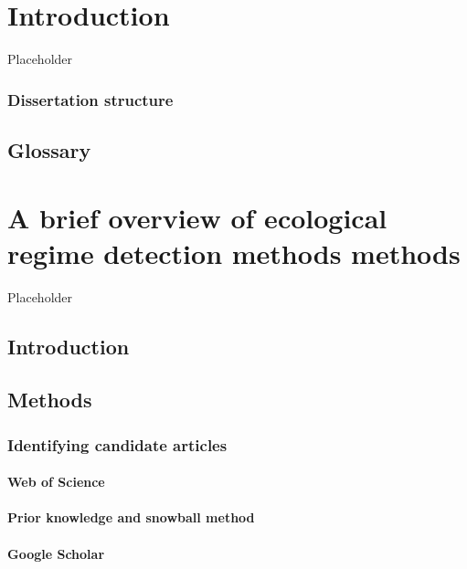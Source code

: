 \documentclass[12pt,twoside,openany]{reedthesis}
\begin{document}
\chapter{Introduction}\label{intro}

Placeholder

\subsection{Dissertation structure}\label{dissertation-structure}

\section{Glossary}\label{glossary}

\chapter{A brief overview of ecological regime detection methods
methods}\label{rdmReview}

Placeholder

\section{Introduction}\label{introduction}

\section{Methods}\label{methods}

\subsection{Identifying candidate
articles}\label{identifying-candidate-articles}

\subsubsection{Web of Science}\label{web-of-science}

\subsubsection{Prior knowledge and snowball
method}\label{prior-knowledge-and-snowball-method}

\subsubsection{Google Scholar}\label{google-scholar}
\end{document}
